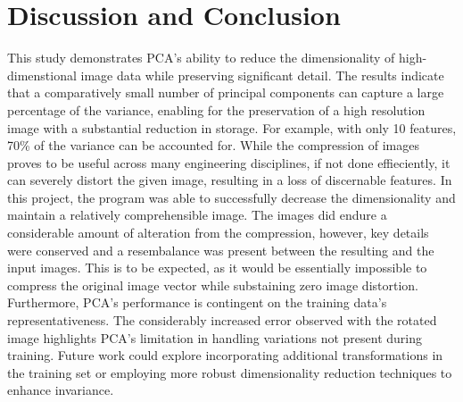 \documentclass[conference]{IEEEtran}
\begin{document}
\section{Discussion and Conclusion}
This study demonstrates PCA's ability to reduce the dimensionality of high-dimenstional image data while preserving significant detail. The results indicate that a comparatively small number of principal components can capture a large percentage of the variance, enabling for the preservation of a high resolution image with a substantial reduction in storage. For example, with only 10 features, 70\% of the variance can be accounted for. While the compression of images proves to be useful across many engineering disciplines, if not done effieciently, it can severely distort the given image, resulting in a loss of discernable features. In this project, the program was able to successfully decrease the dimensionality and maintain a relatively comprehensible image. The images did endure a considerable amount of alteration from the compression, however, key details were conserved and a resembalance was present between the resulting and the input images. This is to be expected, as it would be essentially impossible to compress the original image vector while substaining zero image distortion. Furthermore, PCA's performance is contingent on the training data's representativeness. The considerably increased error observed with the rotated image highlights PCA's limitation in handling variations not present during training. Future work could explore incorporating additional transformations in the training set or employing more robust dimensionality reduction techniques to enhance invariance.

%
%
%
%
%
\end{document}

